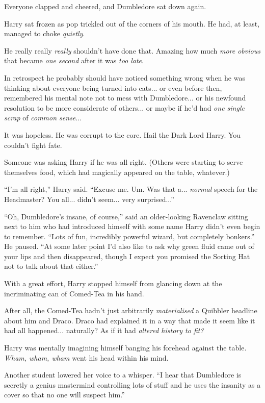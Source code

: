 Everyone clapped and cheered, and Dumbledore sat down again.

Harry sat frozen as pop trickled out of the corners of his mouth. He had, at least, managed to choke \emph{quietly}.

He really really \emph{really} shouldn't have done that. Amazing how much \emph{more obvious} that became \emph{one second} after it was \emph{too late}.

In retrospect he probably should have noticed something wrong when he was thinking about everyone being turned into cats... or even before then, remembered his mental note not to mess with Dumbledore... or his newfound resolution to be more considerate of others... or maybe if he'd had \emph{one single scrap} of \emph{common sense}...

It was hopeless. He was corrupt to the core. Hail the Dark Lord Harry. You couldn't fight fate.

Someone was asking Harry if he was all right. (Others were starting to serve themselves food, which had magically appeared on the table, whatever.)

``I'm all right,'' Harry said. ``Excuse me. Um. Was that a... \emph{normal} speech for the Headmaster? You all... didn't seem... very surprised...''

``Oh, Dumbledore's insane, of course,'' said an older-looking Ravenclaw sitting next to him who had introduced himself with some name Harry didn't even begin to remember. ``Lots of fun, incredibly powerful wizard, but completely bonkers.'' He paused. ``At some later point I'd also like to ask why green fluid came out of your lips and then disappeared, though I expect you promised the Sorting Hat not to talk about that either.''

With a great effort, Harry stopped himself from glancing down at the incriminating can of Comed-Tea in his hand.

After all, the Comed-Tea hadn't just arbitrarily \emph{materialised} a Quibbler headline about him and Draco. Draco had explained it in a way that made it seem like it had all happened... naturally? As if it had \emph{altered history to fit?}

Harry was mentally imagining himself banging his forehead against the table. \emph{Wham, wham, wham} went his head within his mind.

Another student lowered her voice to a whisper. ``I hear that Dumbledore is secretly a genius mastermind controlling lots of stuff and he uses the insanity as a cover so that no one will suspect him.''

